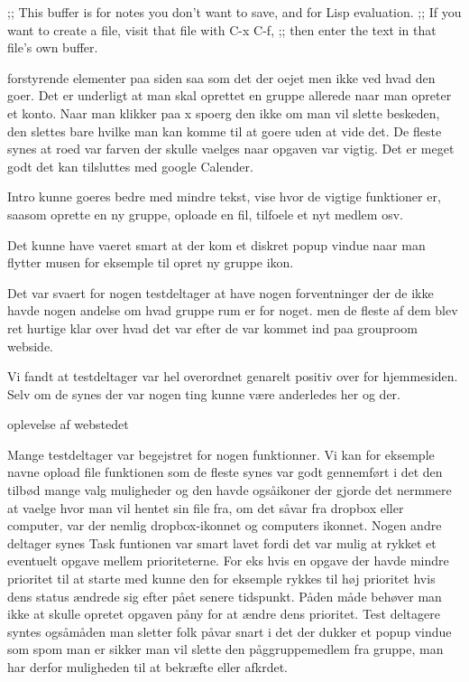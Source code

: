 ;; This buffer is for notes you don't want to save, and for Lisp evaluation.
;; If you want to create a file, visit that file with C-x C-f,
;; then enter the text in that file's own buffer.

forstyrende elementer paa siden saa som det der oejet men ikke ved hvad den goer.
Det er underligt at man skal oprettet en gruppe allerede naar man opreter et konto.
Naar man klikker paa x spoerg den ikke om man vil slette beskeden, den slettes bare hvilke man kan komme til at goere uden at vide det.
De fleste synes at roed var farven der skulle vaelges naar opgaven var vigtig.
Det er meget godt det kan tilsluttes med google Calender.

Intro kunne goeres bedre med mindre tekst, vise hvor de vigtige funktioner er, saasom oprette en ny gruppe, oploade en fil, tilfoele et nyt
medlem osv.

Det kunne have vaeret smart at der kom et diskret popup vindue naar man flytter musen for eksemple til opret ny gruppe ikon.

Det var svaert for nogen testdeltager at have nogen forventninger der de ikke havde nogen andelse om hvad gruppe rum er for noget.
men de fleste af dem blev ret hurtige klar over hvad det var efter de var kommet ind paa grouproom webside.

Vi fandt at testdeltager var hel overordnet genarelt positiv over for hjemmesiden. Selv om de synes der var nogen ting kunne v\ae re anderledes 
her og der. 

\Testdeltagernes oplevelse af webstedet

Mange testdeltager var begejstret for nogen funktionner. Vi kan for eksemple navne opload file funktionen som de fleste synes var godt 
gennemf\o rt i det den tilb\o d mange valg muligheder og den havde ogs\aa  ikoner der gjorde det nermmere at vaelge hvor man vil hentet sin file fra, om det s\aa  var fra dropbox eller computer, var der nemlig dropbox-ikonnet og computers ikonnet. 
Nogen andre deltager synes Task funtionen var smart lavet fordi det var mulig at rykket et eventuelt opgave mellem prioriteterne. For eks hvis
en opgave der havde mindre prioritet til at starte med kunne den for eksemple rykkes til h\o j prioritet hvis dens status \ae ndrede sig efter 
p\aa  et senere tidspunkt. P\aa  den m\aa de beh\o ver man ikke at skulle opretet opgaven p\aa  ny for at \ae ndre dens prioritet.
Test deltagere syntes ogs\aa  m\aa den man sletter folk p\aa  var snart i det der dukker et popup vindue som sp\org om man er sikker man vil 
slette den p\aa g\aeldende gruppemedlem fra gruppe, man har derfor muligheden til at bekr\ae fte eller afkr\aefte det. 

